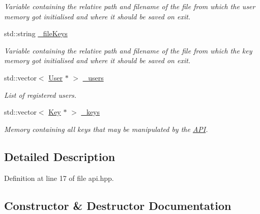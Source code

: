 \begin{DoxyCompactItemize}
\begin{DoxyCompactList}\small\item\em Variable containing the relative path and filename of the file from which the user memory got initialised and where it should be saved on exit. \end{DoxyCompactList}\item 
\hypertarget{classAPI_a7852be9f8494bddc3333f184102f47fb}{}std\+::string \hyperlink{classAPI_a7852be9f8494bddc3333f184102f47fb}{\+\_\+file\+Keys}\label{classAPI_a7852be9f8494bddc3333f184102f47fb}

\begin{DoxyCompactList}\small\item\em Variable containing the relative path and filename of the file from which the key memory got initialised and where it should be saved on exit. \end{DoxyCompactList}\item 
\hypertarget{classAPI_a25dceaad16679832bded6ce63fb1b665}{}std\+::vector$<$ \hyperlink{classUser}{User} $\ast$ $>$ \hyperlink{classAPI_a25dceaad16679832bded6ce63fb1b665}{\+\_\+users}\label{classAPI_a25dceaad16679832bded6ce63fb1b665}

\begin{DoxyCompactList}\small\item\em List of registered users. \end{DoxyCompactList}\item 
\hypertarget{classAPI_a4de53d055dfd4a75c3a9ca25d87fa8ae}{}std\+::vector$<$ \hyperlink{classKey}{Key} $\ast$ $>$ \hyperlink{classAPI_a4de53d055dfd4a75c3a9ca25d87fa8ae}{\+\_\+keys}\label{classAPI_a4de53d055dfd4a75c3a9ca25d87fa8ae}

\begin{DoxyCompactList}\small\item\em Memory containing all keys that may be manipulated by the \hyperlink{classAPI}{A\+P\+I}. \end{DoxyCompactList}\end{DoxyCompactItemize}


\subsection{Detailed Description}


Definition at line 17 of file api.\+hpp.



\subsection{Constructor \& Destructor Documentation}
\hypertarget{classAPI_ab2698dd4fb5e3fefa988f8020937b955}{}
